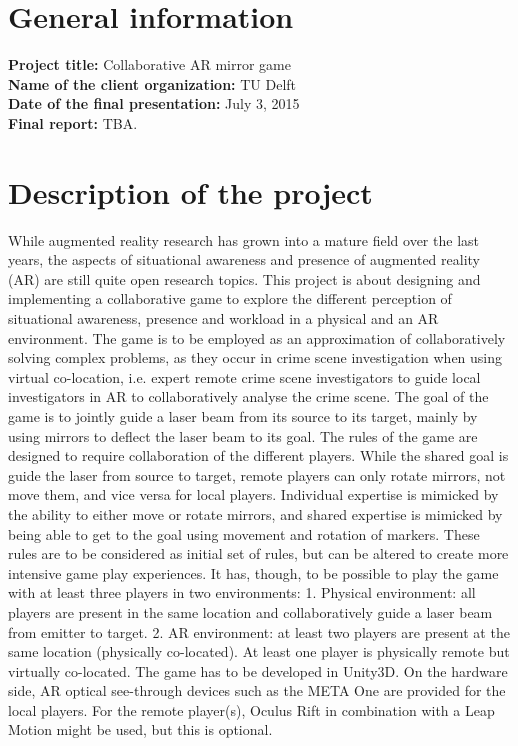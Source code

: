 \documentclass[]{article}
\begin{document}
\section*{General information}
\textbf{Project title:} Collaborative AR mirror game\\
\textbf{Name of the client organization:} TU Delft\\
\textbf{Date of the final presentation:} July 3, 2015\\
\textbf{Final report:} TBA.\\

\section*{Description of the project}
While augmented reality research has grown into a mature field over the last years, the aspects of situational awareness and presence of augmented reality (AR) are still quite open research topics. This project is about designing and implementing a collaborative game to explore the different perception of situational awareness, presence and workload in a physical and an AR environment. The game is to be employed as an approximation of collaboratively solving complex problems, as they occur in crime scene investigation when using virtual co-location, i.e. expert remote crime scene investigators to guide local investigators in AR to collaboratively analyse the crime scene. The goal of the game is to jointly guide a laser beam from its source to its target, mainly by using mirrors to deflect the laser beam to its goal. The rules of the game are designed to require collaboration of the different players. While the shared goal is guide the laser from source to target, remote players can only rotate mirrors, not move them, and vice versa for local players. Individual expertise is mimicked by the ability to either move or rotate mirrors, and shared expertise is mimicked by being able to get to the goal using movement and rotation of markers. These rules are to be considered as initial set of rules, but can be altered to create more intensive game play experiences. It has, though, to be possible to play the game with at least three players in two environments: 1. Physical environment: all players are present in the same location and collaboratively guide a laser beam from emitter to target. 2. AR environment: at least two players are present at the same location (physically co-located). At least one player is physically remote but virtually co-located. The game has to be developed in Unity3D. On the hardware side, AR optical see-through devices such as the META One are provided for the local players. For the remote player(s), Oculus Rift in combination with a Leap Motion might be used, but this is optional. 
\end{document}
